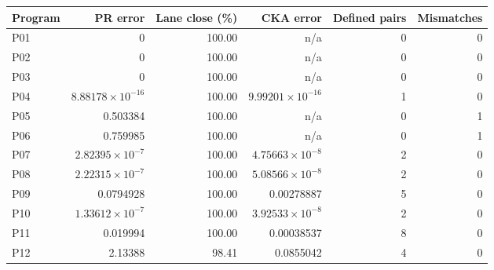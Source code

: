\begin{center}\small
\begin{tabular}{@{}lrrrrr@{}}
\toprule
Program & PR error & Lane close (\%) & CKA error & Defined pairs & Mismatches \\
\midrule
P01 & 0 & 100.00 & n/a & 0 & 0 \\
P02 & 0 & 100.00 & n/a & 0 & 0 \\
P03 & 0 & 100.00 & n/a & 0 & 0 \\
P04 & $8.88178\times 10^{-16}$ & 100.00 & $9.99201\times 10^{-16}$ & 1 & 0 \\
P05 & 0.503384 & 100.00 & n/a & 0 & 1 \\
P06 & 0.759985 & 100.00 & n/a & 0 & 1 \\
P07 & $2.82395\times 10^{-7}$ & 100.00 & $4.75663\times 10^{-8}$ & 2 & 0 \\
P08 & $2.22315\times 10^{-7}$ & 100.00 & $5.08566\times 10^{-8}$ & 2 & 0 \\
P09 & 0.0794928 & 100.00 & 0.00278887 & 5 & 0 \\
P10 & $1.33612\times 10^{-7}$ & 100.00 & $3.92533\times 10^{-8}$ & 2 & 0 \\
P11 & 0.019994 & 100.00 & 0.00038537 & 8 & 0 \\
P12 & 2.13388 & 98.41 & 0.0855042 & 4 & 0 \\
\bottomrule
\end{tabular}
\end{center}
